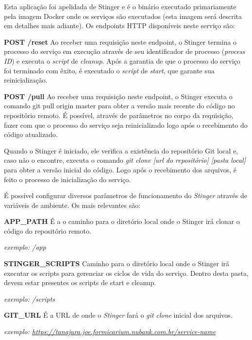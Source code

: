 \documentclass[twosideprint]{politex}
\begin{document}
	Esta aplicação foi apelidada de Stinger e é o binário executado primariamente pela imagem Docker onde os serviços são executados (esta imagem será descrita em detalhes mais adiante). Os endpoints HTTP disponíveis neste serviço são:

    \textbf{POST /reset}
	\newline
	Ao receber uma requisição neste endpoint, o Stinger termina o processo do serviço em execução através de seu identificador de processo (\textit{process ID}) e executa o \textit{script} de \textit{cleanup}. Após a garantia de que o processo do serviço foi terminado com êxito, é executado o \textit{script} de \textit{start}, que garante sua reinicialização.
	
	\textbf{POST /pull}
	\newline
	Ao receber uma requisição neste endpoint, o Stinger executa o comando git pull origin master para obter a versão mais recente do código no repositório remoto. É possível, através de parâmetros no corpo da requisição, fazer com que o processo do serviço seja reinicializado logo após o recebimento do código atualizado.

	Quando o Stinger é iniciado, ele verifica a existência do repositório Git local e, caso não o encontre, executa o comando \textit{git clone [url do repositório] [pasta local]} para obter a versão inicial do código. Logo após o recebimento dos arquivos, é feito o processo de inicialização do serviço.

	É possível configurar diversos parâmetros de funcionamento do \textit{Stinger} através de variáveis de ambiente. Os mais relevantes são:
	
	\textbf{APP\_PATH}
	\newline
	É a o caminho para o diretório local onde o Stinger irá clonar o código do repositório remoto.
	
	\textit{exemplo: /app}

	\textbf{STINGER\_SCRIPTS}
	\newline
	Caminho para o diretório local onde o Stinger irá executar os scripts para gerenciar os ciclos de vida do serviço. Dentro desta pasta, devem estar presentes os scripts de start e cleanup.
	
	\textit{exemplo: /scripts}
	
	\textbf{GIT\_URL}
	\newline
	É a URL de onde o \textit{Stinger} fará o \textit{git clone} inicial dos arquivos.
	
	\textit{exemplo: \url{https://tanajura.joe.formicarium.nubank.com.br/service-name}}
	
\end{document}

